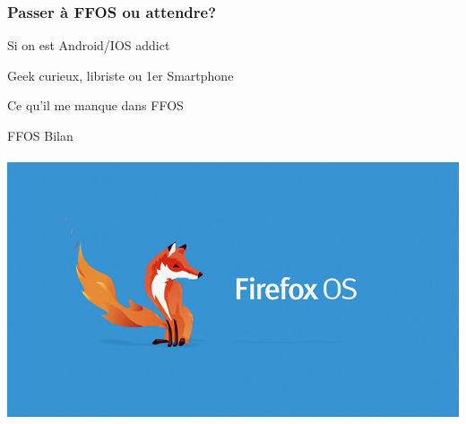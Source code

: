 \documentclass{beamer}
\begin{document}
\begin{frame}
\frametitle{Passer à FFOS ou attendre?}
\begin{block}{Si on est Android/IOS addict}
\end{block}

\begin{block}{Geek curieux, libriste ou 1er Smartphone}
\begin{itemize}
\end{itemize}
\end{block}

\begin{block}{Ce qu'il me manque dans FFOS}
\begin{itemize}
\end{itemize}
\end{block}
\end{frame}

\begin{frame}
\begin{center}
\Huge{FFOS Bilan}
\\~\\
\includegraphics[scale=0.3]{./images/firefox-os.jpg}
\end{center}
\end{frame}
\end{document}
